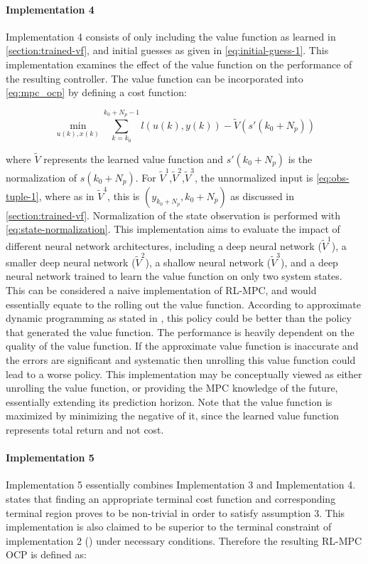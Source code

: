 \paragraph{Implementation 4}
Implementation 4 consists of only including the value function as learned in \autoref{section:trained-vf}, and initial guesses as given in \autoref{eq:initial-guess-1}. This implementation examines the effect of the value function on the performance of the resulting controller. The value function can be incorporated into \autoref{eq:mpc_ocp} by defining a cost function:

\begin{equation}\label{eq:cost-function}
		\min_{u(k),x(k)}  \sum_{k = k_0}^{k_0 + N_p - 1}{l(u(k), y(k))} - \tilde{V}(s'(k_0 + N_p))
\end{equation}

where $\tilde{V}$ represents the learned value function and $s'(k_0+N_p)$ is the normalization of $s(k_0+N_p)$. For $\tilde{V}^1$,$\tilde{V}^2$,$\tilde{V}^3$, the unnormalized input is \autoref{eq:obs-tuple-1}, where as in $\tilde{V}^4$, this is $(y_{k_0+N_p},k_0+N_p)$ as discussed in \autoref{section:trained-vf}. Normalization of the state observation is performed with \autoref{eq:state-normalization}. This implementation aims to evaluate the impact of different neural network architectures, including a deep neural network ($\tilde{V}^1$), a smaller deep neural network ($\tilde{V}^2$), a shallow neural network ($\tilde{V}^3$), and a deep neural network trained to learn the value function on only two system states. This can be considered a naive implementation of RL-MPC, and would essentially equate to the rolling out the value function. According to approximate dynamic programming as stated in \cite{bertsekasLessonsAlphaZeroOptimal}, this policy could be better than the policy that generated the value function. The performance is heavily dependent on the quality of the value function. If the approximate value function is inaccurate and the errors are significant and systematic then unrolling this value function could lead to a worse policy. This implementation may be conceptually viewed as either unrolling the value function, or providing the MPC knowledge of the future, essentially extending its prediction horizon. 
Note that the value function is maximized by minimizing the negative of it, since the learned value function represents total return and not cost.

\paragraph{Implementation 5}
Implementation 5 essentially combines Implementation 3 and Implementation 4. \cite{amritEconomicOptimizationUsing2011} states that finding an appropriate terminal cost function and corresponding terminal region proves to be non-trivial in order to satisfy assumption 3. This implementation is also claimed to be superior to the terminal constraint of implementation 2 (\cite{amritEconomicOptimizationUsing2011}) under necessary conditions. Therefore the resulting RL-MPC OCP is defined as:

